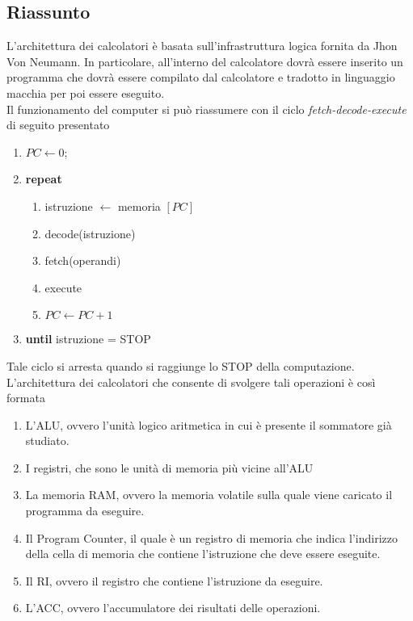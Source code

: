 \documentclass[a4paper]{extarticle}
\begin{document}
\subsection{Riassunto}
L'architettura dei calcolatori è basata sull'infrastruttura logica fornita da Jhon Von Neumann. In particolare, all'interno del calcolatore dovrà essere inserito un programma che dovrà essere compilato dal calcolatore e tradotto in linguaggio macchia per poi essere eseguito.\\
Il funzionamento del computer si può riassumere con il ciclo \textit{fetch-decode-execute} di seguito presentato
\begin{enumerate}
    \item \(PC \leftarrow 0\);
    \item \textbf{repeat}
    \begin{enumerate}
        \item istruzione $\leftarrow$ memoria \([PC]\)
        \item decode(istruzione)
        \item fetch(operandi)
        \item execute
        \item \(PC \leftarrow PC + 1\)
    \end{enumerate}
    \item \textbf{until} istruzione  = STOP
\end{enumerate}
Tale ciclo si arresta quando si raggiunge lo STOP della computazione. L'architettura dei calcolatori che consente di svolgere tali operazioni è così formata
\begin{enumerate}
    \item L'ALU, ovvero l'unità logico aritmetica in cui è presente il sommatore già studiato.
    \item I registri, che sono le unità di memoria più vicine all'ALU
    \item La memoria RAM, ovvero la memoria volatile sulla quale viene caricato il programma da eseguire.
    \item Il Program Counter, il quale è un registro di memoria che indica l'indirizzo della cella di memoria che contiene l'istruzione che deve essere eseguite.
    \item Il RI, ovvero il registro che contiene l'istruzione da eseguire.
    \item L'ACC, ovvero l'accumulatore dei risultati delle operazioni.
\end{enumerate}

\vspace{1em}
\end{document}
